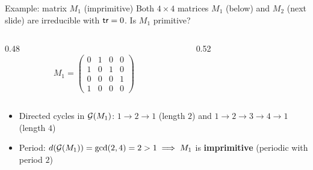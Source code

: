 \documentclass[aspectratio=169]{beamer}\usepackage[]{graphicx}\usepackage[]{xcolor}
\begin{document}
\begin{frame}{Example: matrix $M_1$ (imprimitive)}
Both $4 \times 4$ matrices $M_1$ (below) and $M_2$ (next slide) are irreducible with $\mathsf{tr} = 0$. Is $M_1$ primitive?
\vfill
\begin{columns}[c]
\begin{column}{0.48\textwidth}
\[
M_1 = \begin{pmatrix}
0 & 1 & 0 & 0 \\
1 & 0 & 1 & 0 \\
0 & 0 & 0 & 1 \\
1 & 0 & 0 & 0
\end{pmatrix}
\]
\end{column}
\begin{column}{0.52\textwidth}
\centering
{}
\end{column}
\end{columns}
\vfill
\begin{itemize}
\item Directed cycles in $\mathcal{G}(M_1)$: $1 \to 2 \to 1$ (length $2$) and $1 \to 2 \to 3 \to 4 \to 1$ (length $4$)
\item Period: $d(\mathcal{G}(M_1)) = \gcd(2, 4) = 2 > 1 \implies M_1$ is \textbf{imprimitive} (periodic with period $2$)
\end{itemize}
\end{frame}
\end{document}
